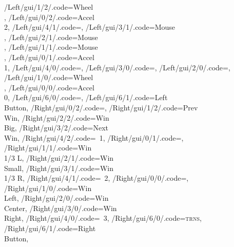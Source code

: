 \documentclass[]{article}
\begin{document}
{        /Left/gui/1/2/.code=Wheel\\\arrowkeyup,
        /Left/gui/0/2/.code=Accel\\2,
    /Left/gui/4/1/.code=,
        /Left/gui/3/1/.code=Mouse\\\arrowkeyleft,
        /Left/gui/2/1/.code=Mouse\\\arrowkeydown,
        /Left/gui/1/1/.code=Mouse\\\arrowkeyright,
        /Left/gui/0/1/.code=Accel\\1,
    /Left/gui/4/0/.code=\shift,
        /Left/gui/3/0/.code=\ctrl,
        /Left/gui/2/0/.code=,
        /Left/gui/1/0/.code=Wheel\\\arrowkeydown,
        /Left/gui/0/0/.code=Accel\\0,
    /Left/gui/6/0/.code=,
        /Left/gui/6/1/.code=Left\\Button,
%
    /Right/gui/0/2/.code=,
        /Right/gui/1/2/.code=Prev\\Win,
        /Right/gui/2/2/.code=Win\\Big,
        /Right/gui/3/2/.code=Next\\Win,
        /Right/gui/4/2/.code=\faBluetoothB~1,
    /Right/gui/0/1/.code=,
        /Right/gui/1/1/.code=Win\\1/3 L,
        /Right/gui/2/1/.code=Win\\Small,
        /Right/gui/3/1/.code=Win\\1/3 R,
        /Right/gui/4/1/.code=\faBluetoothB~2,
    /Right/gui/0/0/.code=,
        /Right/gui/1/0/.code=Win\\Left,
        /Right/gui/2/0/.code=Win\\Center,
        /Right/gui/3/0/.code=Win\\Right,
        /Right/gui/4/0/.code=\faBluetoothB~3,
    /Right/gui/6/0/.code=\textsc{trns},
        /Right/gui/6/1/.code=Right\\Button,
}
\end{document}
